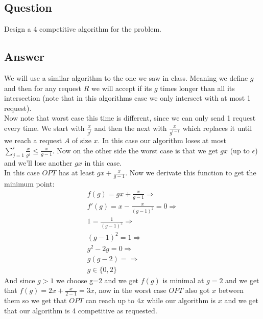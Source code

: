 \subsection*{Question}
Design a 4 competitive algorithm for the problem.

\subsection*{Answer}
We will use a similar algorithm to the one we saw in class. Meaning we define $g$ and then for any request $R$ we will accept if its $g$ times longer than all its intersection (note that in this algorithms case we only intersect with at most 1 request).\\
Now note that worst case this time is different, since we can only send 1 request every time. We start with $\frac{x}{g^{i}}$ and then the next with $\frac{x}{g^{i-1}}$ which replaces it until we reach a request $A$ of size $x$. In this case our algorithm loses at most $ \sum_{j=1}^{i} \frac{x}{g^j} \leq \frac{x}{g-1}$. Now on the other side the worst case is that we get $gx$ (up to $\epsilon$) and we'll lose another $gx$ in this case.\\
In this case $OPT$ has at least $gx + \frac{x}{g-1}$. Now we derivate this function to get the minimum point:
\begin{gather*}
    f(g) = gx + \frac{x}{g-1} \Rightarrow\\
    f'(g) = x - \frac{x}{(g-1)^2} = 0 \Rightarrow\\
    1 = \frac{1}{(g-1)^2} \Rightarrow\\
    (g-1)^2 = 1 \Rightarrow\\
    g^2-2g = 0 \Rightarrow\\
    g(g - 2) =  \Rightarrow\\
    g \in \{0,2\}
\end{gather*}
And since $g > 1$ we choose g=2 and we get $f(g)$ is minimal at $g=2$ and we get that $f(g) = 2x + \frac{x}{2-1} = 3x$, now in the worst case $OPT$ also got $x$ between them so we get that $OPT$ can reach up to $4x$ while our algorithm is $x$ and we get that our algorithm is 4 competitive as requested.